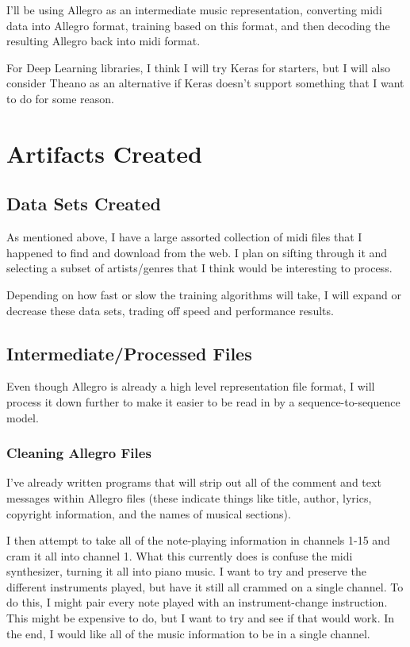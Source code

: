 \documentclass[12pt]{article}
\begin{document}
I'll be using Allegro as an intermediate music representation, converting midi data into Allegro format, training based on this format, and then decoding the resulting Allegro back into midi format.

For Deep Learning libraries, I think I will try Keras for starters, but I will also consider Theano as an alternative if Keras doesn't support something that I want to do for some reason.

\section{Artifacts Created}

\subsection{Data Sets Created}
As mentioned above, I have a large assorted collection of midi files that I happened to find and download from the web. I plan on sifting through it and selecting a subset of artists/genres that I think would be interesting to process.

Depending on how fast or slow the training algorithms will take, I will expand or decrease these data sets, trading off speed and performance results.

\subsection{Intermediate/Processed Files}
Even though Allegro is already a high level representation file format, I will process it down further to make it easier to be read in by a sequence-to-sequence model.

\subsubsection{Cleaning Allegro Files}
I've already written programs that will strip out all of the comment and text messages within Allegro files (these indicate things like title, author, lyrics, copyright information, and the names of musical sections).

I then attempt to take all of the note-playing information in channels 1-15 and cram it all into channel 1. What this currently does is confuse the midi synthesizer, turning it all into piano music. I want to try and preserve the different instruments played, but have it still all crammed on a single channel. To do this, I might pair every note played with an instrument-change instruction. This might be expensive to do, but I want to try and see if that would work. In the end, I would like all of the music information to be in a single channel.
\end{document}
